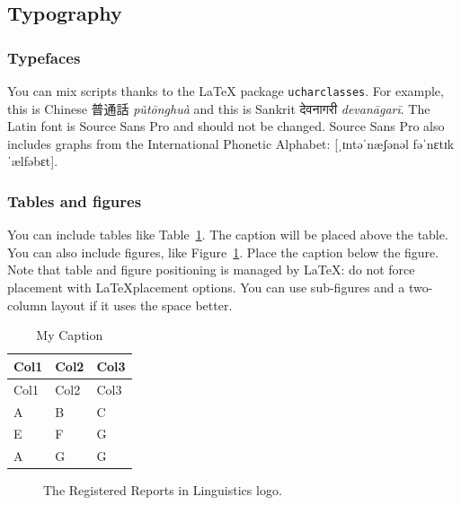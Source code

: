 \documentclass[
]{rrling}
\begin{document}
\subsection*{Typography}\label{typography}

\subsubsection{Typefaces}\label{typefaces}

You can mix scripts thanks to the LaTeX package \texttt{ucharclasses}.
For example, this is Chinese 普通話 \emph{pǔtōnghuà} and this is Sankrit
देवनागरी \emph{devanāgarī}. The Latin font is Source Sans Pro and should
not be changed. Source Sans Pro also includes graphs from the
International Phonetic Alphabet: {[}ˌɪntəˈnæʃənəl fəˈnɛtɪk ˈælfəbɛt{]}.

\subsubsection{Tables and figures}\label{tables-and-figures}

You can include tables like Table~\ref{tbl-letters}. The caption will be
placed above the table. You can also include figures, like
Figure~\ref{fig-example}. Place the caption below the figure. Note that
table and figure positioning is managed by LaTeX: do not force placement
with LaTeXplacement options. You can use sub-figures and a two-column
layout if it uses the space better.

\begin{longtable}[]{@{}lll@{}}
\caption{My Caption}\label{tbl-letters}\tabularnewline
\toprule\noalign{}
Col1 & Col2 & Col3 \\
\midrule\noalign{}
\endfirsthead
\toprule\noalign{}
Col1 & Col2 & Col3 \\
\midrule\noalign{}
\endhead
\bottomrule\noalign{}
\endlastfoot
A & B & C \\
E & F & G \\
A & G & G \\
\end{longtable}

\begin{figure}


\caption{\label{fig-example}The Registered Reports in Linguistics logo.}

\end{figure}%
\end{document}
